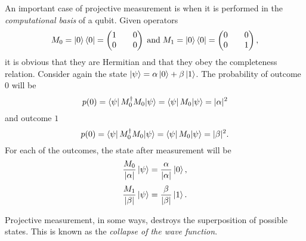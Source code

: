 \documentclass[../../dissertation.tex]{subfiles}
\begin{document}
An important case of projective measurement is when it is performed in the
\textit{computational basis} of a qubit. Given operators 
\begin{equation}
	M_0 = \ket{0}\bra{0} = \begin{pmatrix}
				1 && 0\\
				0 && 0
				\end{pmatrix}
	\;
	\text{and}
	\;
	M_1 = \ket{0}\bra{0} = \begin{pmatrix}
				0 && 0\\
				0 && 1
				\end{pmatrix},
\end{equation}
it is obvious that they are Hermitian and that they obey the completeness
relation. Consider again the state $\ket{\psi}=\alpha\ket{0} + \beta\ket{1}$.
The probability of outcome $0$ will be 
\begin{equation}
	p(0) = \bra{\psi}M_0^\dag M_0{\ket{\psi}} = \bra{\psi}M_0{\ket{\psi}} = |\alpha|^2
\end{equation}
and outcome $1$
\begin{equation}
	p(0) = \bra{\psi}M_0^\dag M_0{\ket{\psi}} = \bra{\psi}M_0{\ket{\psi}} = |\beta|^2.
\end{equation}
For each of the outcomes, the state after measurement will be
\begin{equation} 
	\frac{M_0}{|\alpha|} \ket{\psi} = \frac{\alpha}{|\alpha|} \ket{0},
\end{equation}
\begin{equation} 
	\frac{M_1}{|\beta|} \ket{\psi} = \frac{\beta}{|\beta|} \ket{1}.
\end{equation}\par
Projective measurement, in some ways, destroys the superposition of possible
states. This is known as the \textit{collapse of the wave function}. 
\end{document}
